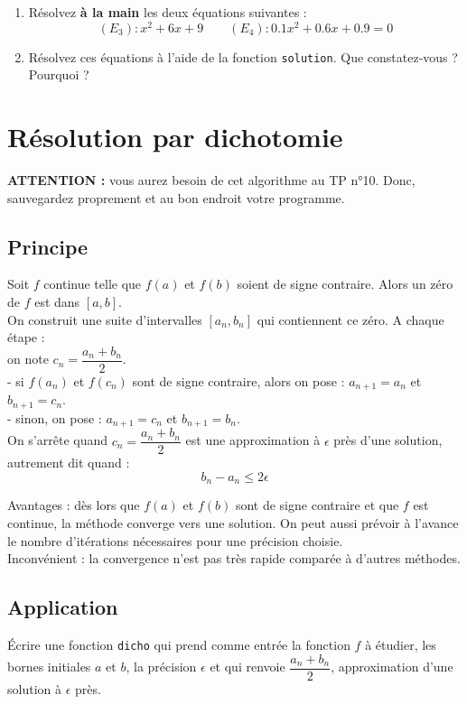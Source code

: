\begin{exercice}
\begin{enumerate}
\item R\' esolvez \textbf{\` a la main} les deux \' equations suivantes : 
\[(E_3)\colon x^2+6x+9\qquad (E_4)\colon 0.1x^2+0.6x+0.9=0\]
\item R\' esolvez ces \' equations \` a l'aide de la fonction \verb?solution?. Que constatez-vous ? Pourquoi ?
\end{enumerate}
\end{exercice}


\section{R\' esolution par dichotomie}
\noindent \textbf{ATTENTION :} vous aurez besoin de cet algorithme au TP n°10. Donc, sauvegardez proprement et au bon endroit votre programme.
\subsection{Principe}
\noindent Soit $f$ continue telle que $f(a)$ et $f(b)$ soient de signe contraire. Alors un z\' ero de $f$ est dans $[a,b]$.\\
On construit une suite d'intervalles $[a_n,b_n]$ qui contiennent ce z\' ero. A chaque \' etape :\\
on note $c_n=\dfrac{a_n+b_n}{2}$.\\
- si $f(a_n)$ et $f(c_n)$ sont de signe contraire, alors on pose : $a_{n+1}=a_n$ et $b_{n+1}=c_n$.\\
- sinon, on pose : $a_{n+1}=c_n$ et $b_{n+1}=b_n$.\\
On s'arr\^ ete quand $c_n=\dfrac{a_n+b_n}{2}$ est une approximation \` a $\epsilon$ pr\` es d'une solution, autrement dit quand :
\[b_n-a_n\leqslant 2\epsilon\]

\noindent Avantages : d\` es lors que $f(a)$ et $f(b)$ sont de signe contraire et que $f$ est continue, la m\' ethode converge vers une solution. On peut aussi pr\' evoir \` a l'avance le nombre d'it\' erations n\' ecessaires pour une pr\' ecision choisie.\\
Inconv\' enient : la convergence n'est pas tr\` es rapide compar\' ee \` a d'autres m\' ethodes.

\subsection{Application}

\begin{exercice}
Écrire une fonction \verb?dicho? qui prend comme entr\' ee la fonction $f$ \` a \' etudier, les bornes initiales $a$ et $b$, la pr\' ecision $\epsilon$ et qui renvoie $\dfrac{a_n+b_n}{2}$, approximation d’une solution \` a $\epsilon$ pr\` es.
\end{exercice}



